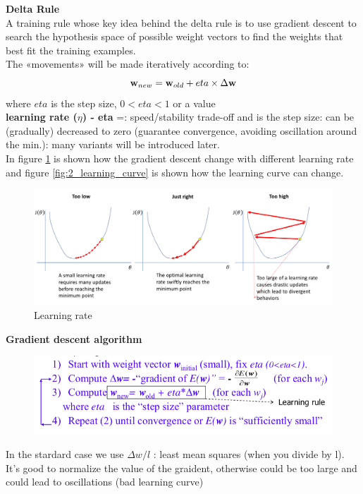 \documentclass[../main.tex]{subfiles}
\begin{document}
\noindent\textbf{Delta Rule}\\
A training rule whose key idea behind the delta rule is to use gradient descent to search the hypothesis space of possible weight vectors to find the weights that best fit the training examples.\\
The «movements» will be made iteratively according to:
$$\bold{w}_{new} = \bold{w}_{old} + eta \times \Delta \bold{w}$$
where $eta$ is the step size, $0<eta<1$ or a value \\

\textbf{learning rate ($\eta$) - eta} =: speed/stability trade-off and is the step size: can be (gradually) decreased to zero (guarantee convergence, avoiding oscillation around the min.): many variants will be introduced later.\\

In figure \ref{fig:2_learning_rate} is shown how the gradient descent change with different learning rate and figure \ref{fig:2_learning_curve} is shown how the learning curve can change.

\begin{figure}[H]
    \centering
    \includegraphics[scale = 0.29]{lectures/2_linear_model/2_learning_rate.png}
    \caption{Learning rate}
    \label{fig:2_learning_rate}
\end{figure}
\noindent\textbf{Gradient descent algorithm}
\begin{figure}[H]
    \centering
    \includegraphics[scale = 0.5]{lectures/2_linear_model/Gradient_alg.png}
    \label{fig:2_gradient_alg}
\end{figure}
\noindent In the stardard case we use $\Delta w/ l$ : least mean squares (when you divide by l). It's good to normalize the value of the graident, otherwise could be too large and could lead to oscillations (bad learning curve)\\
\end{document}
